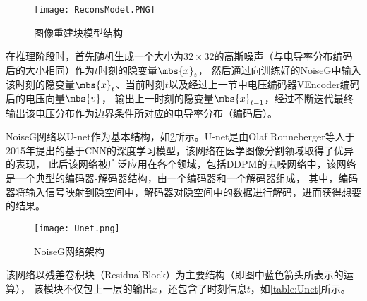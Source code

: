 \begin{figure}[h]
    \centering
    \texttt{[image: ReconsModel.PNG]}
    \caption{图像重建块模型结构}
    \label{figure:ReconsModel}
\end{figure}

在推理阶段时，首先随机生成一个大小为$32\times 32$的高斯噪声（与电导率分布编码后的大小相同）作为$t$时刻的隐变量$\mbs{x}_{t}$，
然后通过向训练好的NoiseG中输入该时刻的隐变量$\mbs{x}_t$、当前时刻$t$以及经过上一节中电压编码器VEncoder编码后的电压向量$\mbs{v}$，
输出上一时刻的隐变量$\mbs{x}_{t-1}$，经过不断迭代最终输出该电压分布作为边界条件所对应的电导率分布（编码后）。

NoiseG网络以U-net作为基本结构，如\cref{figure:Unet}所示。U-net是由Olaf Ronneberger等人于2015年提出的基于CNN的深度学习模型\cite{2015U}，该网络在医学图像分割领域取得了优异的表现，
此后该网络被广泛应用在各个领域，包括DDPM的去噪网络中\cite{DDPM}，该网络是一个典型的编码器-解码器结构，由一个编码器和一个解码器组成，
其中，编码器将输入信号映射到隐空间中，解码器对隐空间中的数据进行解码，进而获得想要的结果。

\begin{figure}[h]
    \centering
    \texttt{[image: Unet.png]}
    \caption{NoiseG网络架构}
    \label{figure:Unet}
\end{figure}

该网络以残差卷积块（ResidualBlock）为主要结构（即图中蓝色箭头所表示的运算），
该模块不仅包上一层的输出$x$，还包含了时刻信息$t$，如\cref{table:Unet}所示。


